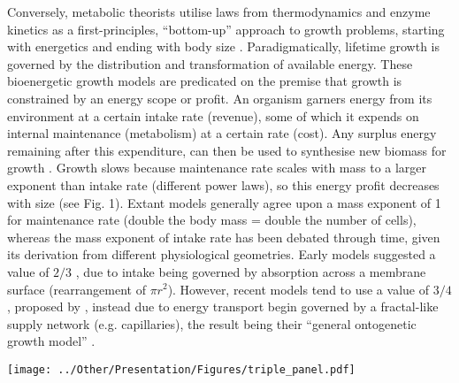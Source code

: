 \documentclass[a4paper]{article} %
\begin{document}
    Conversely, metabolic theorists utilise laws from thermodynamics and enzyme kinetics as a first-principles, ``bottom-up'' approach to growth problems, starting with energetics and ending with body size \autocite{Brown2004}. Paradigmatically, lifetime growth is governed by the distribution and transformation of available energy. These bioenergetic growth models are predicated on the premise that growth is constrained by an energy scope or profit. An organism garners energy from its environment at a certain intake rate (revenue), some of which it expends on internal maintenance (metabolism) at a certain rate (cost). Any surplus energy remaining after this expenditure, can then be used to synthesise new biomass for growth \autocite{Holdway1984, Rochet2001, Enberg2012, VanGemert2019}. Growth slows because maintenance rate scales with mass to a larger exponent than intake rate (different power laws), so this energy profit decreases with size (see Fig. 1). Extant models generally agree upon a mass exponent of 1 for maintenance rate (double the body mass = double the number of cells), whereas the mass exponent of intake rate has been debated through time, given its derivation from different physiological geometries. Early models suggested a value of $2/3$ \autocite{Putter1920,vonBert1938, VonBertalanffy1957}, due to intake being governed by absorption across a membrane surface (rearrangement of $\pi r^2$). However, recent models tend to use a value of $3/4$, proposed by \textcite{West1997}, instead due to energy transport begin governed by a fractal-like supply network (e.g. capillaries), the result being their ``general ontogenetic growth model'' \autocite{West2001}.

    \begin{center}
        \begin{minipage}{\linewidth}
        \texttt{[image: ../Other/Presentation/Figures/triple\_panel.pdf]}
        \label{growth_schedules}
        \end{minipage}%
    \end{center}
\end{document}
